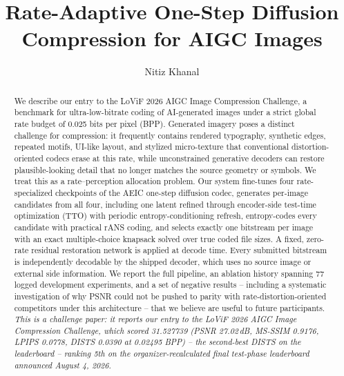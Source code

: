 \documentclass[runningheads]{llncs}
\begin{document}
\title{Rate-Adaptive One-Step Diffusion Compression for AIGC Images}

\author{Nitiz Khanal}


\maketitle

\begin{abstract}
We describe our entry to the LoViF 2026 AIGC Image Compression Challenge, a benchmark for ultra-low-bitrate coding of AI-generated images under a strict global rate budget of 0.025 bits per pixel (BPP). Generated imagery poses a distinct challenge for compression: it frequently contains rendered typography, synthetic edges, repeated motifs, UI-like layout, and stylized micro-texture that conventional distortion-oriented codecs erase at this rate, while unconstrained generative decoders can restore plausible-looking detail that no longer matches the source geometry or symbols. We treat this as a rate--perception allocation problem. Our system fine-tunes four rate-specialized checkpoints of the AEIC one-step diffusion codec, generates per-image candidates from all four, including one latent refined through encoder-side test-time optimization (TTO) with periodic entropy-conditioning refresh, entropy-codes every candidate with practical rANS coding, and selects exactly one bitstream per image with an exact multiple-choice knapsack solved over true coded file sizes. A fixed, zero-rate residual restoration network is applied at decode time. Every submitted bitstream is independently decodable by the shipped decoder, which uses no source image or external side information. We report the full pipeline, an ablation history spanning 77 logged development experiments, and a set of negative results -- including a systematic investigation of why PSNR could not be pushed to parity with rate-distortion-oriented competitors under this architecture -- that we believe are useful to future participants. \emph{This is a challenge paper: it reports our entry to the LoViF 2026 AIGC Image Compression Challenge, which scored 31.527739 (PSNR 27.02\,dB, MS-SSIM 0.9176, LPIPS 0.0778, DISTS 0.0390 at 0.02495 BPP) -- the second-best DISTS on the leaderboard -- ranking 5th on the organizer-recalculated final test-phase leaderboard announced August 4, 2026.}
\end{abstract}
\end{document}
